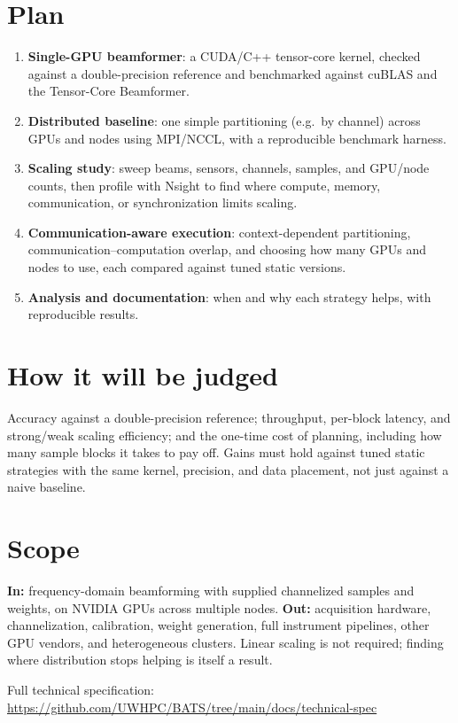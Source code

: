 \documentclass[10pt,letterpaper]{article}
\begin{document}
\section*{Plan}
\begin{enumerate}
  \item \textbf{Single-GPU beamformer}: a CUDA/C++ tensor-core kernel, checked against a double-precision reference and benchmarked against cuBLAS and the Tensor-Core Beamformer.
  \item \textbf{Distributed baseline}: one simple partitioning (e.g.\ by channel) across GPUs and nodes using MPI/NCCL, with a reproducible benchmark harness.
  \item \textbf{Scaling study}: sweep beams, sensors, channels, samples, and GPU/node counts, then profile with Nsight to find where compute, memory, communication, or synchronization limits scaling.
  \item \textbf{Communication-aware execution}: context-dependent partitioning, communication--computation overlap, and choosing how many GPUs and nodes to use, each compared against tuned static versions.
  \item \textbf{Analysis and documentation}: when and why each strategy helps, with reproducible results.
\end{enumerate}

\section*{How it will be judged}
Accuracy against a double-precision reference; throughput, per-block latency, and strong/weak scaling efficiency; and the one-time cost of planning, including how many sample blocks it takes to pay off. Gains must hold against tuned static strategies with the same kernel, precision, and data placement, not just against a naive baseline.

\section*{Scope}
\textbf{In:} frequency-domain beamforming with supplied channelized samples and weights, on NVIDIA GPUs across multiple nodes.
\textbf{Out:} acquisition hardware, channelization, calibration, weight generation, full instrument pipelines, other GPU vendors, and heterogeneous clusters. Linear scaling is not required; finding where distribution stops helping is itself a result.

\vfill
\small Full technical specification: \url{https://github.com/UWHPC/BATS/tree/main/docs/technical-spec}
\end{document}
